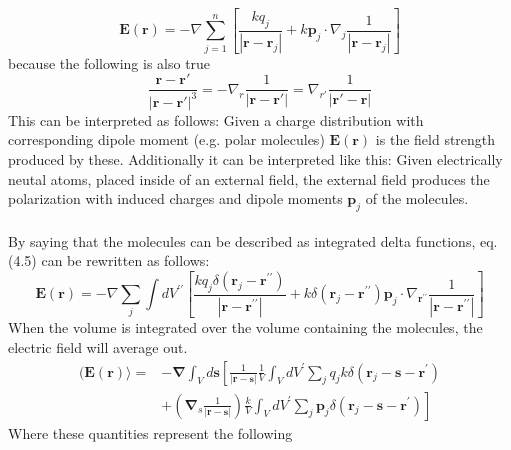 \begin{equation}
    \textbf{E}(\textbf{r}) = -\nabla \sum_{j=1}^n \left[ \frac{kq_j}{|\textbf{r}-\textbf{r}_j|} +k \textbf{p}_j \cdot \nabla_j \frac{1}{|\textbf{r}-\textbf{r}_j|} \right]
\end{equation}
because the following is also true
\begin{equation}
    \frac{\textbf{r}-\textbf{r}'}{|\textbf{r}-\textbf{r}'|^3} = -\nabla_r\frac{1}{|\textbf{r}-\textbf{r}'|} = \nabla_{r'} \frac{1}{|\textbf{r}'-\textbf{r}|}
\end{equation}
This can be interpreted as follows: Given a charge distribution with corresponding dipole moment (e.g. polar molecules) $\textbf{E}(\textbf{r})$ is the field strength produced by these.
Additionally it can be interpreted like this: Given electrically neutal atoms, placed inside of an external field, the external field produces the polarization with induced charges and dipole moments $\textbf{p}_j$ of the molecules.\\
\\
\noindent By saying that the molecules can be described as integrated delta functions, eq. (4.5) can be rewritten as follows:
\begin{equation}
    \mathbf{E}(\mathbf{r})=-\nabla \sum_{j} \int d V^{\prime \prime}\left[\frac{k q_{j} \delta\left(\mathbf{r}_{j}-\mathbf{r}^{\prime \prime}\right)}{\left|\mathbf{r}-\mathbf{r}^{\prime \prime}\right|}+k \delta\left(\mathbf{r}_{j}-\mathbf{r}^{\prime \prime}\right) \mathbf{p}_{j} \cdot \nabla_{\mathbf{r}^{\prime \prime}} \frac{1}{\left|\mathbf{r}-\mathbf{r}^{\prime \prime}\right|}\right]
\end{equation}
When the volume is integrated over the volume containing the molecules, the electric field will average out.
\begin{equation}
    \begin{aligned}
    (\mathbf{E}(\mathbf{r})\rangle=&-\boldsymbol{\nabla} \int_{V} d \mathbf{s}\left[\frac{1}{|\mathbf{r}-\mathbf{s}|} \frac{1}{V} \int_{V} d V^{\prime} \sum_{j} q_{j} k \delta\left(\mathbf{r}_{j}-\mathbf{s}-\mathbf{r}^{\prime}\right)\right.\\
    &\left.+\left(\boldsymbol{\nabla}_{s} \frac{1}{|\mathbf{r}-\mathbf{s}|}\right) \frac{k}{V} \int_{V} d V^{\prime} \sum_{j} \mathbf{p}_{j} \delta\left(\mathbf{r}_{j}-\mathbf{s}-\mathbf{r}^{\prime}\right)\right]
    \end{aligned}
\end{equation}
Where these quantities represent the following
